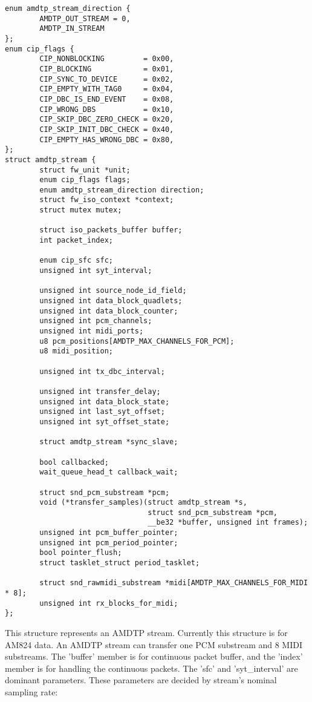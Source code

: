 \documentclass[onecolumn]{article}
\begin{document}
\begin{verbatim}
enum amdtp_stream_direction {
        AMDTP_OUT_STREAM = 0,
        AMDTP_IN_STREAM
};
enum cip_flags {
        CIP_NONBLOCKING         = 0x00,
        CIP_BLOCKING            = 0x01,
        CIP_SYNC_TO_DEVICE      = 0x02,
        CIP_EMPTY_WITH_TAG0     = 0x04,
        CIP_DBC_IS_END_EVENT    = 0x08,
        CIP_WRONG_DBS           = 0x10,
        CIP_SKIP_DBC_ZERO_CHECK = 0x20,
        CIP_SKIP_INIT_DBC_CHECK = 0x40,
        CIP_EMPTY_HAS_WRONG_DBC = 0x80,
};
struct amdtp_stream {
        struct fw_unit *unit;
        enum cip_flags flags;
        enum amdtp_stream_direction direction;
        struct fw_iso_context *context;
        struct mutex mutex;

        struct iso_packets_buffer buffer;
        int packet_index;

        enum cip_sfc sfc;
        unsigned int syt_interval;

        unsigned int source_node_id_field;
        unsigned int data_block_quadlets;
        unsigned int data_block_counter;
        unsigned int pcm_channels;
        unsigned int midi_ports;
        u8 pcm_positions[AMDTP_MAX_CHANNELS_FOR_PCM];
        u8 midi_position;

        unsigned int tx_dbc_interval;

        unsigned int transfer_delay;
        unsigned int data_block_state;
        unsigned int last_syt_offset;
        unsigned int syt_offset_state;

        struct amdtp_stream *sync_slave;

        bool callbacked;
        wait_queue_head_t callback_wait;

        struct snd_pcm_substream *pcm;
        void (*transfer_samples)(struct amdtp_stream *s,
                                 struct snd_pcm_substream *pcm,
                                 __be32 *buffer, unsigned int frames);
        unsigned int pcm_buffer_pointer;
        unsigned int pcm_period_pointer;
        bool pointer_flush;
        struct tasklet_struct period_tasklet;

        struct snd_rawmidi_substream *midi[AMDTP_MAX_CHANNELS_FOR_MIDI * 8];
        unsigned int rx_blocks_for_midi;
};
\end{verbatim}

This structure represents an AMDTP stream. Currently this structure is for AM824 data. An AMDTP stream can transfer one PCM substream and 8 MIDI substreams. The 'buffer' member is for continuous packet buffer, and the 'index' member is for handling the continuous packets. The 'sfc' and 'syt\_interval' are dominant parameters. These parameters are decided by stream's nominal sampling rate:
\end{document}
